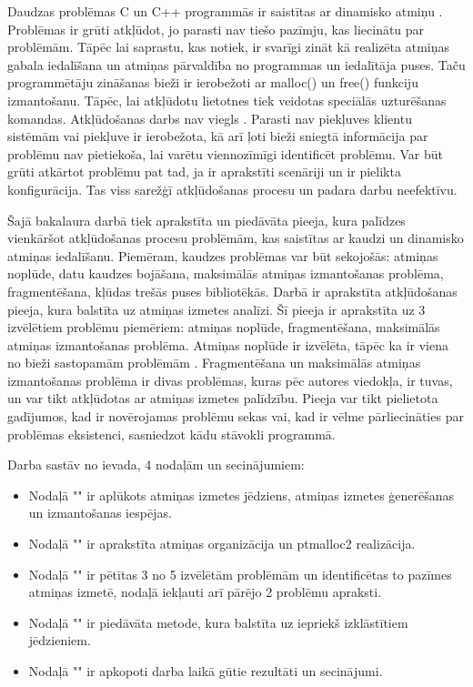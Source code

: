 ﻿Daudzas problēmas C un C++ programmās ir saistītas ar dinamisko atmiņu \cite{TFM}.
Problēmas ir grūti atkļūdot, jo parasti nav tiešo pazīmju, kas liecinātu par problēmām.
Tāpēc lai saprastu, kas notiek, ir svarīgi zināt kā realizēta atmiņas gabala iedalīšana un atmiņas pārvaldība no programmas un iedalītāja puses.
Taču programmētāju zināšanas bieži ir ierobežoti ar malloc() un free() funkciju izmantošanu. 
Tāpēc, lai atkļūdotu lietotnes tiek veidotas speciālās uzturēšanas komandas.
Atkļūdošanas darbs nav viegls \cite{ER}. Parasti nav piekļuves klientu sistēmām vai piekļuve ir ierobežota, kā arī ļoti bieži sniegtā informācija par problēmu nav pietiekoša, lai varētu viennozīmīgi identificēt problēmu.
Var būt grūti atkārtot problēmu pat tad, ja ir aprakstīti scenāriji un ir pielikta konfigurācija.
Tas viss sarežģī atkļūdošanas procesu un padara darbu neefektīvu.

Šajā bakalaura darbā tiek aprakstīta un piedāvāta pieeja, kura palīdzes vienkāršot atkļūdošanas procesu problēmām, kas saistītas ar kaudzi un dinamisko atmiņas iedalīšanu.
Piemēram, kaudzes problēmas var būt sekojošās: atmiņas noplūde, datu kaudzes bojāšana, maksimālās atmiņas izmantošanas problēma, fragmentēšana, kļūdas trešās puses bibliotēkās.
Darbā ir aprakstīta atkļūdošanas pieeja, kura balstīta uz atmiņas izmetes analīzi.
Šī pieeja ir aprakstīta uz 3 izvēlētiem problēmu piemēriem: atmiņas noplūde, fragmentēšana, maksimālās atmiņas izmantošanas problēma.
Atmiņas noplūde ir izvēlēta, tāpēc ka ir viena no bieži sastopamām problēmām \cite{GNED}.
Fragmentēšana un maksimālās atmiņas izmantošanas problēma ir divas problēmas, kuras pēc autores viedokļa, ir tuvas, un var tikt atkļūdotas ar atmiņas izmetes palīdzību.
Pieeja var tikt pielietota gadījumos, kad ir novērojamas problēmu sekas vai, kad ir vēlme pārliecināties par problēmas eksistenci, sasniedzot kādu stāvokli programmā.



Darba sastāv no ievada, 4 nodaļām un secinājumiem:
\begin{itemize}
    \item Nodaļā "{\@nodone}" ir aplūkots atmiņas izmetes jēdziens, atmiņas izmetes ģenerēšanas un izmantošanas iespējas.
    \item Nodaļā "{\@nodtwo}" ir aprakstīta atmiņas organizācija un  ptmalloc2 realizācija. 
    \item Nodaļā "{\@nodthree}" ir pētītas 3 no 5 izvēlētām problēmām un identificētas to pazīmes atmiņas izmetē, nodaļā iekļauti arī pārējo 2 problēmu apraksti.
    \item Nodaļā "{\@nodfour}" ir piedāvāta metode, kura balstīta uz iepriekš izklāstītiem jēdzieniem.
    \item Nodaļā "{\@nodsix}" ir apkopoti darba laikā gūtie rezultāti un secinājumi.
\end{itemize} 
